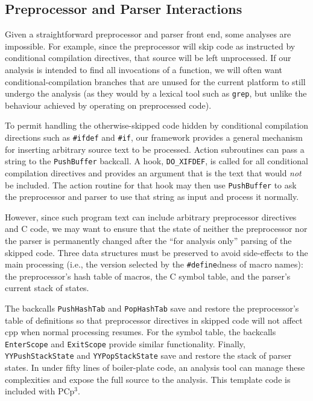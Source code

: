 \documentclass{article}
\newcommand{\pcp}{\mbox{\textsf{PCp}$^3$}}
\newcommand{\Cpp}{\mbox{\textsf{cpp}}}
\newcommand{\C}{\mbox{C}}
\newcommand{\ppd}[1]{\texttt{\##1}}
\newcommand{\ie}{i.e.,}
\begin{document}
\subsection{Preprocessor and Parser Interactions}
\label{sec:interactions}

Given a straightforward preprocessor and parser front end, some analyses
are impossible.  For example, since the preprocessor will skip code as
instructed by conditional compilation directives, that source will be
left unprocessed. If our analysis is intended to find all invocations
of a function, we will often want conditional-compilation branches that
are unused for the current platform to still undergo the analysis (as
they would by a lexical tool such as \texttt{grep}, but unlike the
behaviour achieved by operating on preprocessed code).

To permit handling the otherwise-skipped code hidden by conditional
compilation directions such as \ppd{ifdef} and \ppd{if}, our framework
provides a general mechanism for inserting arbitrary source text to be
processed.  Action subroutines can pass a string to the \texttt{PushBuffer}
backcall.  A hook, \texttt{DO\_XIFDEF}, is called for all conditional
compilation directives and provides an argument that is the text that
would \emph{not} be included.  The action routine for that hook may then
use \texttt{PushBuffer} to ask the preprocessor and parser to use that
string as input and process it normally.

However, since such program text can include arbitrary preprocessor
directives and \C{} code, we may want to ensure that the state of
neither the preprocessor nor the parser is permanently changed after the
``for analysis only'' parsing of the skipped code.  Three data
structures must be preserved to avoid side-effects to the main
processing (\ie{} the version selected by the \ppd{define}dness of macro
names): the preprocessor's hash table of macros, the \C{} symbol table,
and the parser's current stack of states.  

The backcalls \texttt{PushHashTab} and \texttt{PopHashTab} save and
restore the preprocessor's table of definitions so that preprocessor
directives in skipped code will not affect \Cpp{} when normal processing
resumes.  For the symbol table, the backcalls \texttt{EnterScope} and
\texttt{ExitScope} provide similar functionality.  Finally,
\texttt{YYPushStackState} and \texttt{YYPopStackState} save and restore
the stack of parser states.  In under fifty lines of boiler-plate code,
an analysis tool can manage these complexities and expose the full source to
the analysis.  This template code is included with \pcp{}.
\end{document}
